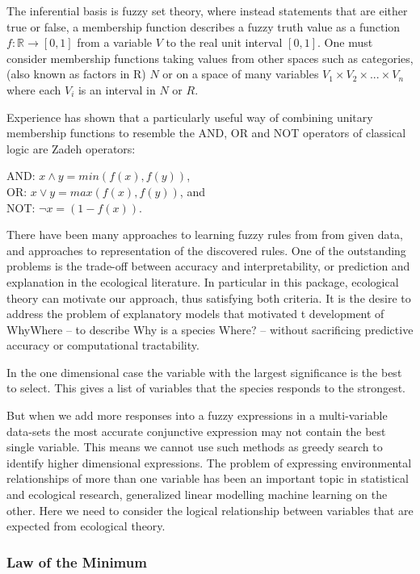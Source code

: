 \documentclass{article}
\newcommand{\pkg}[1]{{\fontseries{b}\selectfont #1}}
\begin{document}
The inferential basis is fuzzy set theory, where instead statements that are either true or false, a membership function describes a fuzzy truth value as a function $f: \mathbb{R} \rightarrow [0,1]$ from a variable $V$ to the real unit interval $[0,1]$.  One must consider membership functions taking values from other spaces such as categories, (also known as factors in R) $N$ or on a space of many variables $V_1 \times V_2 \times ... \times V_n$ where each $V_i$ is an interval in $N$ or $R$. 

Experience has shown that a particularly useful way of combining unitary membership functions to resemble the AND, OR and NOT operators of classical logic are Zadeh operators:

AND: $x \land y = min(f(x),f(y))$, \\
OR: $x \lor y = max(f(x),f(y))$, and \\
NOT: $ \lnot x = (1-f(x))$.  


There have been many approaches to learning fuzzy rules from from given data, and approaches to representation of the discovered rules.  One of the outstanding problems is the trade-off between accuracy and interpretability, or prediction and explanation in the ecological literature.  In particular in this package, ecological theory can motivate our approach, thus satisfying both criteria.  It is the desire to address the problem of explanatory models that motivated t development of \pkg{WhyWhere} -- to describe Why is a species Where? -- without sacrificing predictive accuracy or computational tractability.  

In the one dimensional case the variable with the largest significance is the best to select.  This gives a list of variables that the species responds to the strongest.  

But when we add more responses into a fuzzy expressions in a multi-variable data-sets the most accurate conjunctive expression may not contain the best single variable.  This means we cannot use such methods as greedy search to identify higher dimensional expressions.  The problem of expressing environmental relationships of more than one variable has been an important topic in statistical and ecological research, generalized linear modelling {} machine learning {} on the other.  Here we need to consider the logical relationship between variables that are expected from ecological theory.


\subsubsection{Law of the Minimum}
\end{document}
